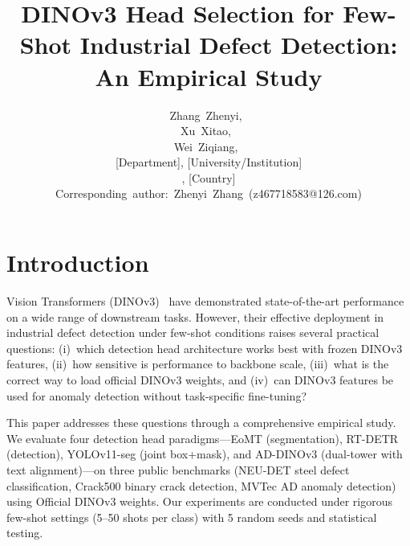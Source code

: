 \documentclass[journal]{IEEEtran}
\title{DINOv3 Head Selection for Few-Shot Industrial Defect Detection: An Empirical Study}
\author{
        Zhang~Zhenyi,~\IEEEmembership{Student~Member,~IEEE,}\\
        Xu~Xitao,~\IEEEmembership{Member,~IEEE,}\\
        Wei~Ziqiang,~\IEEEmembership{Senior~Member,~IEEE,}\\
        [Department], [University/Institution]\\
        [City], [Country]\\
        Corresponding~author:~Zhenyi~Zhang~(z467718583@126.com)
}
\begin{document}
\maketitle
\IEEEdisplaynontitleabstractindextext
\IEEEpeerreviewmaketitle

\section{Introduction}
 Vision Transformers (DINOv3)~\cite{ref9} have demonstrated state-of-the-art performance on a wide range of downstream tasks. However, their effective deployment in industrial defect detection under few-shot conditions raises several practical questions: (i)~which detection head architecture works best with frozen DINOv3 features, (ii)~how sensitive is performance to backbone scale, (iii)~what is the correct way to load official DINOv3 weights, and (iv)~can DINOv3 features be used for anomaly detection without task-specific fine-tuning?

This paper addresses these questions through a comprehensive empirical study. We evaluate four detection head paradigms---EoMT (segmentation), RT-DETR (detection), YOLOv11-seg (joint box+mask), and AD-DINOv3 (dual-tower with text alignment)---on three public benchmarks (NEU-DET steel defect classification, Crack500 binary crack detection, MVTec AD anomaly detection) using Official DINOv3 weights. Our experiments are conducted under rigorous few-shot settings (5--50 shots per class) with 5 random seeds and statistical testing.
\end{document}
